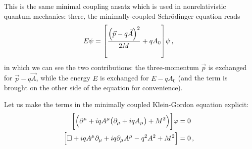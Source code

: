 \documentclass[main.tex]{subfiles}
\begin{document}
This is the same minimal coupling ansatz which is used in nonrelativistic quantum mechanics: there, the minimally-coupled Schrödinger equation reads 
%
\begin{align}
E \psi = \qty[\frac{\qty(\vec{p} - q \vec{A})^2}{2M}  + q A_0 ] \psi 
\,,
\end{align}
%
in which we can see the two contributions: the three-momentum \(\vec{p}\) is exchanged for \(\vec{p} - q \vec{A}\), while the energy \(E\) is exchanged for \(E - q A_0 \) (and the term is brought on the other side of the equation for convenience). 

Let us make the terms in the minimally coupled Klein-Gordon equation explicit: 
%
\begin{align}
\qty[\qty(\partial^{\mu } +iqA^{\mu } \qty(\partial_{\mu } +i q A_{\mu }) + M^2)] \varphi &= 0  \\
\qty[\square + iq A^{\mu } \partial_{\mu } + iq \partial_{\mu } A^{\mu } - q^2A^2 + M^2] &=0
\,,
\end{align}
%
\end{document}
